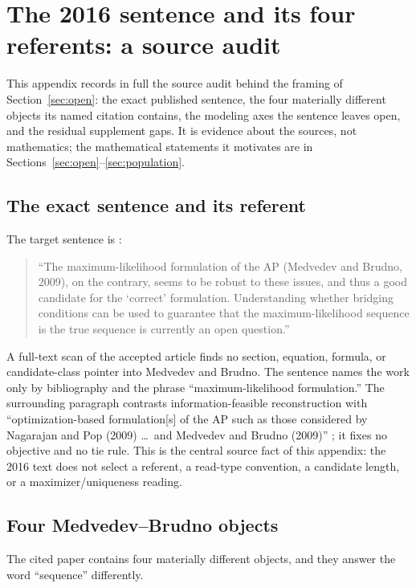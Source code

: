 \section{The 2016 sentence and its four referents: a source audit}
\label{app:referents}

This appendix records in full the source audit behind the framing of
Section~\ref{sec:open}: the exact published sentence, the four materially
different objects its named citation contains, the modeling axes the sentence
leaves open, and the residual supplement gaps. It is evidence about the
sources, not mathematics; the mathematical statements it motivates are in
Sections~\ref{sec:open}--\ref{sec:population}.

\subsection{The exact sentence and its referent}

The target sentence is \parencite[Discussion, p.~i501]{shomorony2016}:

\begin{quote}
``The maximum-likelihood formulation of the AP (Medvedev and Brudno, 2009), on
the contrary, seems to be robust to these issues, and thus a good candidate for
the `correct' formulation. Understanding whether bridging conditions can be used
to guarantee that the maximum-likelihood sequence is the true sequence is
currently an open question.''
\end{quote}

A full-text scan of the accepted article finds no section, equation, formula, or
candidate-class pointer into Medvedev and Brudno. The sentence names the work
only by bibliography and the phrase ``maximum-likelihood formulation.'' The
surrounding paragraph contrasts information-feasible reconstruction with
``optimization-based formulation[s] of the AP such as those considered by
Nagarajan and Pop (2009) \dots\ and Medvedev and Brudno (2009)''
\parencite{nagarajan2009,medvedev2009}; it fixes no objective and no tie rule. This is
the central source fact of this appendix: \srcfact{} the 2016 text does not
select a referent, a read-type convention, a candidate length, or a
maximizer/uniqueness reading.

\subsection{Four Medvedev--Brudno objects}

The cited paper contains four materially different objects, and they answer the
word ``sequence'' differently.

